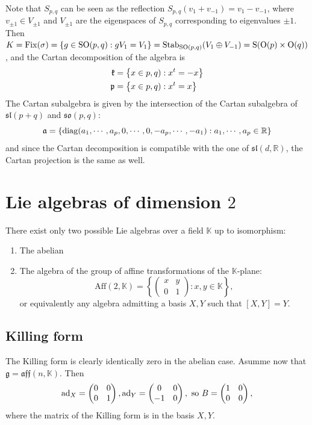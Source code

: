 \documentclass{report}
\begin{document}
Note that $S_{p,q}$ can be seen as the reflection $S_{p,q}(v_1 + v_{-1}) = v_1 - v_{-1}$, where $v_{\pm 1} \in V_{\pm 1}$ and $V_{\pm 1}$ are the eigenspaces of $S_{p,q}$ corresponding to eigenvalues $\pm 1$.
Then $K = \mathrm{Fix}(\sigma) = \left\{ g \in \operatorname{{\mathrm{SO}}}(p,q) : g V_1 = V_1 \right\} = \mathrm{Stab}_{\operatorname{{\mathrm{SO}}}(p,q)}(V_1 \oplus V_{-1}) = \mathrm{S}(\mathrm{O}(p) \times \mathrm{O}(q))$, and the Cartan decomposition of the algebra is
\begin{align*}
    \mathfrak{k} &= \left\{ x \in \so(p,q) : x^t = -x \right\}\\
    \mathfrak{p} &= \left\{ x \in \so(p,q) : x^t = x \right\}\\
\end{align*}
The Cartan subalgebra is given by the intersection of the Cartan subalgebra of $\mathfrak{sl}(p+q)$ and $\mathfrak{so}(p,q)$:
\[
\mathfrak{a} = \left\{ \operatorname{diag}(a_1, \cdots, a_p, 0, \cdots, 0, -a_p, \cdots, -a_1) : a_1, \cdots, a_p \in \mathbb R  \right\}
\]
and since the Cartan decomposition is compatible with the one of $\mathfrak{sl}(d, \mathbb R)$, the Cartan projection is the same as well.

\section{Lie algebras of dimension $2$}
There exist only two possible Lie algebras over a field $\mathbb K$ up to isomorphism:
\begin{enumerate}
    \item The abelian
    \item The algebra of the group of affine transformations of the $\mathbb K$-plane:
    \[
        \mathrm{Aff}(2,\mathbb K) = \left\{  
    \begin{pmatrix}
    x & y \\
    0 & 1
    \end{pmatrix}: x,y \in \mathbb K\right\},
    \]
    or equivalently any algebra admitting a basis $X, Y$ such that $[X,Y] = Y$.
\end{enumerate}
\subsection{Killing form}
The Killing form is clearly identically zero in the abelian case.
Asumme now that $\mathfrak g = \mathfrak{aff}(n, \mathbb K)$.
Then
\[
\operatorname{ad}_X = \begin{pmatrix}
    0 & 0 \\
    0 & 1
    \end{pmatrix}, 
    \operatorname{ad}_Y = \begin{pmatrix}
    0 & 0 \\
    -1 & 0
    \end{pmatrix},
    \text{ so }
    B = \begin{pmatrix}
    1 & 0 \\
    0 & 0
    \end{pmatrix},
\]
where the matrix of the Killing form is in the basis $X, Y$.
\end{document}
